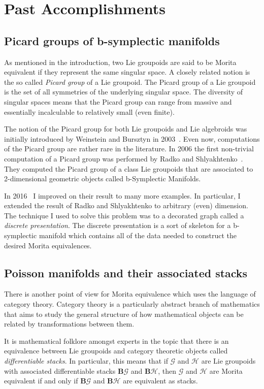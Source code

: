 \documentclass[11pt, letterpaper]{article}
\renewcommand{\H}{\mathcal{H}}
\newcommand{\B}{\mathbf{B}}
\newcommand{\G}{\mathcal{G}}
\begin{document}
\section{Past Accomplishments}

\subsection{Picard groups of b-symplectic manifolds}
As mentioned in the introduction, two Lie groupoids are said to be Morita equivalent if they represent the same singular space. A closely related notion is the so called \emph{Picard group} of a Lie groupoid. The Picard group of a Lie groupoid is the set of all symmetries of the underlying singular space. The diversity of singular spaces means that the Picard group can range from massive and essentially incalculable to relatively small (even finite).

The notion of the Picard group for both Lie groupoids and Lie algebroids was initially introduced by Weinstein and Bursztyn in 2003~\cite{MR2074983}. Even now, computations of the Picard group are rather rare in the literature. In 2006 the first non-trivial computation of a Picard group was performed by Radko and Shlyakhtenko~\cite{picsurface}. They computed the Picard group of a class Lie groupoids that are associated to 2-dimensional geometric objects called b-Symplectic Manifolds.

In 2016~\cite{bsymp} I improved on their result to many more examples. In particular, I extended the result of Radko and Shlyakhtenko to arbitrary (even) dimension. The technique I used to solve this problem was to a decorated graph called a \emph{discrete presentation}. The discrete presentation is a sort of skeleton for a b-symplectic manifold which contains all of the data needed to construct the desired Morita equivalences.

\subsection{Poisson manifolds and their associated stacks}
There is another point of view for Morita equivalence which uses the language of category theory. Category theory is a particularly abstract branch of mathematics that aims to study the general structure of how mathematical objects can be related by transformations between them. 

It is mathematical folklore amongst experts in the topic that there is an equivalence between Lie groupoids and category theoretic objects called \emph{differentiable stacks}. In particular, this means that if \( \G \) and \( \H \) are Lie groupoids with associated differentiable stacks \( \B \G \) and \( \B \H \), then \( \G \) and \( \H \) are Morita equivalent if and only if \( \B \G \) and \( \B \H \) are equivalent as stacks.
\end{document}
